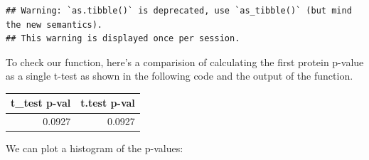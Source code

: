 \documentclass[12pt,]{book}
\newenvironment{Shaded}{\begin{snugshade}}{\end{snugshade}}
\newcommand{\CommentTok}[1]{\textcolor[rgb]{0.56,0.35,0.01}{\textit{#1}}}
\newcommand{\DataTypeTok}[1]{\textcolor[rgb]{0.13,0.29,0.53}{#1}}
\newcommand{\DecValTok}[1]{\textcolor[rgb]{0.00,0.00,0.81}{#1}}
\newcommand{\KeywordTok}[1]{\textcolor[rgb]{0.13,0.29,0.53}{\textbf{#1}}}
\newcommand{\NormalTok}[1]{#1}
\newcommand{\OperatorTok}[1]{\textcolor[rgb]{0.81,0.36,0.00}{\textbf{#1}}}
\newcommand{\StringTok}[1]{\textcolor[rgb]{0.31,0.60,0.02}{#1}}
\begin{document}
\begin{Shaded}
\end{Shaded}

\begin{verbatim}
## Warning: `as.tibble()` is deprecated, use `as_tibble()` (but mind the new semantics).
## This warning is displayed once per session.
\end{verbatim}

To check our function, here's a comparision of calculating the first protein
p-value as a single t-test as shown in the following code and the output of
the function.

\begin{Shaded}
\end{Shaded}

\begin{tabular}{rr}
\toprule
t\_test p-val & t.test p-val\\
\midrule
0.0927 & 0.0927\\
\bottomrule
\end{tabular}

We can plot a histogram of the p-values:
\end{document}
